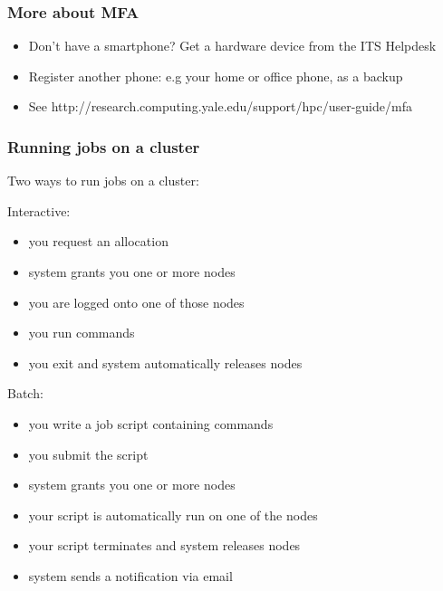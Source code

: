 \documentclass[10pt]{beamer}
\begin{document}
\begin{frame}[fragile]
\frametitle{More about MFA}

\begin{itemize}
\item Don't have a smartphone? Get a hardware device from the ITS Helpdesk
\item Register another phone: e.g your home or office phone, as a backup
\item See http://research.computing.yale.edu/support/hpc/user-guide/mfa
\end{itemize}


\end{frame}
\begin{frame}[fragile]
\frametitle{Running jobs on a cluster}

Two ways to run jobs on a cluster:

Interactive:
\begin{itemize}
\item you request an allocation
\item system grants you one or more nodes
\item you are logged onto one of those nodes
\item you run commands
\item you exit and system automatically releases nodes
\end{itemize}

Batch:
\begin{itemize}
\item you write a job script containing commands
\item you submit the script
\item system grants you one or more nodes
\item your script is automatically run on one of the nodes
\item your script terminates and system releases nodes
\item system sends a notification via email
\end{itemize}

\end{frame}
\end{document}
